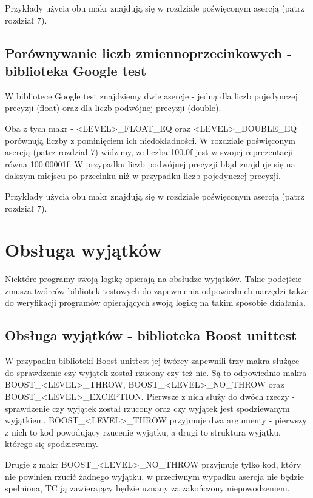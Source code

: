 \documentclass[12pt,a4paper,notitlepage]{report}
\begin{document}
Przykłady użycia obu makr znajdują się w rozdziale poświęconym asercją (patrz rozdział 7).

\section{Porównywanie liczb zmiennoprzecinkowych - biblioteka Google test}

W bibliotece Google test znajdziemy dwie asercje - jedną dla liczb pojedynczej precyzji (float) oraz dla liczb podwójnej precyzji (double).

Oba z tych makr - <LEVEL>{\_}FLOAT{\_}EQ oraz <LEVEL>{\_}DOUBLE{\_}EQ porównują liczby z pominięciem ich niedokładności. W rozdziale poświęconym asercją (patrz rozdział 7) widzimy, że liczba 100.0f jest w swojej reprezentacji równa 100.00001f. W przypadku liczb podwójnej precyzji błąd znajduje się na dalszym miejscu po przecinku niż w przypadku liczb pojedynczej precyzji.

Przykłady użycia obu makr znajdują się w rozdziale poświęconym asercją (patrz rozdział 7).

\chapter{Obsługa wyjątków}

Niektóre programy swoją logikę opierają na obsłudze wyjątków. Takie podejście zmusza twórców bibliotek testowych do zapewnienia odpowiednich narzędzi także do weryfikacji programów opierających swoją logikę na takim sposobie działania. 

\section{Obsługa wyjątków - biblioteka Boost unittest}

W przypadku biblioteki Boost unittest jej twórcy zapewnili trzy makra służące do sprawdzenie czy wyjątek został rzucony czy też nie. Są to odpowiednio makra BOOST{\_}<LEVEL>{\_}THROW, BOOST{\_}<LEVEL>{\_}NO{\_}THROW oraz BOOST{\_}<LEVEL>{\_}EXCEPTION. Pierwsze z nich służy do dwóch rzeczy - sprawdzenie czy wyjątek został rzucony oraz czy wyjątek jest spodziewanym wyjątkiem. BOOST{\_}<LEVEL>{\_}THROW przyjmuje dwa argumenty - pierwszy z nich to kod powodujący rzucenie wyjątku, a drugi to struktura wyjątku, którego się spodziewamy. 

Drugie z makr BOOST{\_}<LEVEL>{\_}NO{\_}THROW przyjmuje tylko kod, który nie powinien rzucić żadnego wyjątku, w przeciwnym wypadku asercja nie będzie spełniona, TC ją zawierający będzie uznany za zakończony niepowodzeniem.
\end{document}
